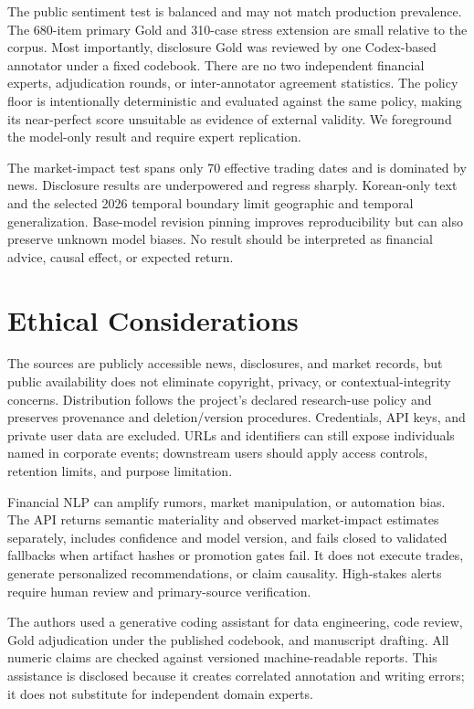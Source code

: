 \documentclass[11pt]{article}
\begin{document}
The public sentiment test is balanced and may not match production prevalence. The 680-item primary Gold and 310-case stress extension are small relative to the corpus. Most importantly, disclosure Gold was reviewed by one Codex-based annotator under a fixed codebook. There are no two independent financial experts, adjudication rounds, or inter-annotator agreement statistics. The policy floor is intentionally deterministic and evaluated against the same policy, making its near-perfect score unsuitable as evidence of external validity. We foreground the model-only result and require expert replication.

The market-impact test spans only 70 effective trading dates and is dominated by news. Disclosure results are underpowered and regress sharply. Korean-only text and the selected 2026 temporal boundary limit geographic and temporal generalization. Base-model revision pinning improves reproducibility but can also preserve unknown model biases. No result should be interpreted as financial advice, causal effect, or expected return.

\section*{Ethical Considerations}

The sources are publicly accessible news, disclosures, and market records, but public availability does not eliminate copyright, privacy, or contextual-integrity concerns. Distribution follows the project's declared research-use policy and preserves provenance and deletion/version procedures. Credentials, API keys, and private user data are excluded. URLs and identifiers can still expose individuals named in corporate events; downstream users should apply access controls, retention limits, and purpose limitation.

Financial NLP can amplify rumors, market manipulation, or automation bias. The API returns semantic materiality and observed market-impact estimates separately, includes confidence and model version, and fails closed to validated fallbacks when artifact hashes or promotion gates fail. It does not execute trades, generate personalized recommendations, or claim causality. High-stakes alerts require human review and primary-source verification.

The authors used a generative coding assistant for data engineering, code review, Gold adjudication under the published codebook, and manuscript drafting. All numeric claims are checked against versioned machine-readable reports. This assistance is disclosed because it creates correlated annotation and writing errors; it does not substitute for independent domain experts.
\end{document}
